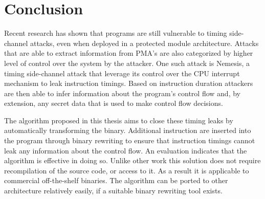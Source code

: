 \section{Conclusion}
Recent research has shown that programs are still vulnerable to timing side-channel attacks, even when deployed in a protected module architecture. 
Attacks that are able to extract information from PMA's are also categorized by higher level of control over the system by the attacker. 
One such attack is Nemesis, a timing side-channel attack that leverage its control over the CPU interrupt mechanism to leak instruction timings. 
Based on instruction duration attackers are then able to infer information about the program's control flow and, by extension, any secret data that is used to make control flow decisions. 

The algorithm proposed in this thesis aims to close these timing leaks by automatically transforming the binary. 
Additional instruction are inserted into the program through binary rewriting to ensure that instruction 
timings cannot leak any information about the control flow. An evaluation indicates that the algorithm is effective in doing so.
Unlike other work this solution does not require recompilation of the 
source code, or access to it. 
As a result it is applicable to commercial off-the-shelf binaries.  
The algorithm can be ported to other architecture relatively easily, if a suitable binary rewriting tool exists.
